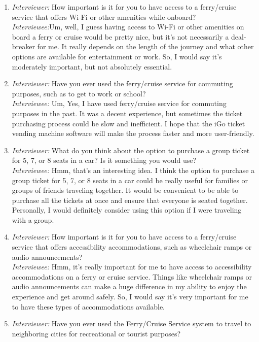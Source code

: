 \begin{enumerate}
\item \emph{Interviewer:} How important is it for you to have access to a ferry/cruise service that offers Wi-Fi or other amenities while onboard?\\
\emph{Interviewee:}Um, well, I guess having access to Wi-Fi or other amenities on board a ferry or cruise would be pretty nice, but it's not necessarily a deal-breaker for me. It really depends on the length of the journey and what other options are available for entertainment or work. So, I would say it's moderately important, but not absolutely essential.
\item \emph{Interviewer:} Have you ever used the ferry/cruise service for commuting purposes, such as to get to work or school?\\
\emph{Interviewee:} Um, Yes, I have used ferry/cruise service for commuting purposes in the past. It was a decent experience, but sometimes the ticket purchasing process could be slow and inefficient. I hope that the iGo ticket vending machine software will make the process faster and more user-friendly.
\item \emph{Interviewer:} What do you think about the option to purchase a group ticket for 5, 7, or 8 seats in a car? Is it something you would use?\\
\emph{Interviewee:} Hmm, that's an interesting idea. I think the option to purchase a group ticket for 5, 7, or 8 seats in a car could be really useful for families or groups of friends traveling together. It would be convenient to be able to purchase all the tickets at once and ensure that everyone is seated together. Personally, I would definitely consider using this option if I were traveling with a group.
\item \emph{Interviewer:} How important is it for you to have access to a ferry/cruise service that offers accessibility accommodations, such as wheelchair ramps or audio announcements?\\
\emph{Interviewee:} Hmm, it's really important for me to have access to accessibility accommodations on a ferry or cruise service. Things like wheelchair ramps or audio announcements can make a huge difference in my ability to enjoy the experience and get around safely. So, I would say it's very important for me to have these types of accommodations available.
\item \emph{Interviewer:} Have you ever used the Ferry/Cruise Service system to travel to neighboring cities for recreational or tourist purposes?\\

\end{enumerate}
